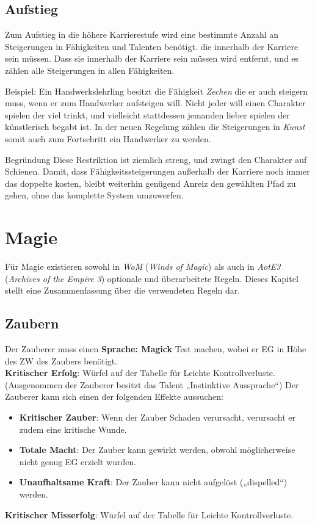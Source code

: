 \documentclass[a4paper,10pt,twoside,twocolumn,openany,nodeprecatedcode,bg=print]{dndbook}
\begin{document}
\subsection{Aufstieg}
Zum Aufstieg in die höhere Karrierestufe wird eine bestimmte Anzahl an Steigerungen in Fähigkeiten und Talenten benötigt. die innerhalb der Karriere sein müssen.
Dass sie innerhalb der Karriere sein müssen wird entfernt, und es zählen alle Steigerungen in allen Fähigkeiten.

Beispiel: Ein Handwerkslehrling besitzt die Fähigkeit \textit{Zechen} die er auch steigern muss, wenn er zum Handwerker aufsteigen will. Nicht jeder will einen Charakter spielen der viel trinkt, und vielleicht stattdessen jemanden lieber spielen der künstlerisch begabt ist. In der neuen Regelung zählen die Steigerungen in \textit{Kunst} somit auch zum Fortschritt ein Handwerker zu werden.

\begin{DndComment}{Begründung}
  Diese Restriktion ist ziemlich streng, und zwingt den Charakter auf Schienen. Damit, dass Fähigkeitssteigerungen außerhalb der Karriere noch immer das doppelte kosten, bleibt weiterhin genügend Anreiz den gewählten Pfad zu gehen, ohne das komplette System umzuwerfen.
\end{DndComment}


\clearpage
\section{Magie}

Für Magie existieren sowohl in \textit{WoM} (\textit{Winds of Magic}) als auch in \textit{AotE3} (\textit{Archives of the Empire 3}) optionale und überarbeitete Regeln.
Dieses Kapitel stellt eine Zusammenfassung über die verwendeten Regeln dar.

\subsection{Zaubern}
Der Zauberer muss einen \textbf{Sprache: Magick} Test machen, wobei er EG in Höhe des ZW des Zaubers benötigt.\\
\textbf{Kritischer Erfolg}: Würfel auf der Tabelle für Leichte Kontrollverluste. (Ausgenommen der Zauberer besitzt das Talent „Instinktive Aussprache“) Der Zauberer kann sich einen der folgenden Effekte aussuchen:
\begin{itemize}
  \item \textbf{Kritischer Zauber}: Wenn der Zauber Schaden verursacht, verursacht er zudem eine kritische Wunde.
  \item \textbf{Totale Macht}: Der Zauber kann gewirkt werden, obwohl möglicherweise nicht genug EG erzielt wurden.
  \item \textbf{Unaufhaltsame Kraft}: Der Zauber kann nicht aufgelöst („dispelled“) werden.
\end{itemize}
\textbf{Kritischer Misserfolg}: Würfel auf der Tabelle für Leichte Kontrollverluste.
\end{document}
